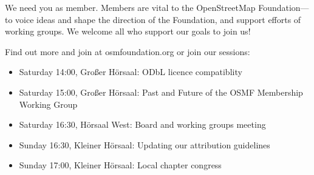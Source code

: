 \begin{landscape}
{    We need you as member. Members are vital
    to the OpenStreetMap Foundation---to voice ideas
    and shape the direction of the Foundation,
    and support efforts of working groups. We
    welcome all who support our goals to join us!
    
    Find out more and join at osmfoundation.org
    or join our sessions:
    \begin{itemize}
      \RaggedRight
      \setlength{\itemsep}{-3pt} %
      \item Saturday 14:00, Großer Hörsaal: ODbL licence compatiblity
      \item Saturday 15:00, Großer Hörsaal: Past and Future of the OSMF Membership Working Group
      \item Saturday 16:30, Hörsaal West: Board and working groups meeting
      \item Sunday 16:30, Kleiner Hörsaal: Updating our attribution guidelines
      \item Sunday 17:00, Kleiner Hörsaal: Local chapter congress
    \end{itemize}
    \justifying
  }%


  \setlength{\fboxsep}{4.5pt}%
  \vspace{0.5\baselineskip}%
  \noindent%
  \setlength{\fboxsep}{3pt}

\end{landscape}

\newpage

